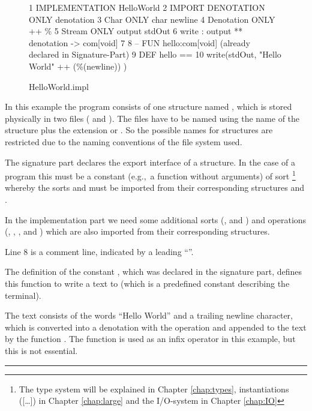 \begin{figure}[htbp]
  \leavevmode
  \begin{prog}
    1    IMPLEMENTATION HelloWorld
    2    IMPORT  DENOTATION      ONLY denotation
    3            Char            ONLY char newline
    4            Denotation      ONLY ++ \% 
    5            Stream          ONLY output stdOut 
    6                      write : output ** denotation -> com[void]
    7    
    8    -- FUN hello:com[void] (already declared in Signature-Part)
    9    DEF hello ==
    10        write(stdOut, "Hello World" ++ (\%(newline)) )
  \end{prog}
  \caption{HelloWorld.impl}
\end{figure}

In this example the program consists of one structure named
, which  is stored physically in two files
( and ). 
The files have to be named using the name of the structure plus the
extension  or .
So the possible names for structures are restricted due to the naming
conventions of the  file system used.

The signature part declares the export interface of a structure.
In the case of a program this must be a constant (e.g.,~a function
without arguments) of sort
\footnote{The type system will be explained in Chapter
\ref{chap:types}, instantiations ([\dots]) in Chapter
\ref{chap:large} and the I/O-system in  Chapter \ref{chap:IO}} whereby
the sorts  and  must be imported from their
corresponding structures  and .

In the implementation part we need some additional sorts (,
 and ) and operations
(, , \pro{\%},\pro{++} and ) which
are also imported from their corresponding structures.

Line 8 is a comment line, indicated by a leading ``\pro{--}''.

The definition of the constant , which was declared in the
signature part, defines this function to write a text to 
(which is a predefined constant describing the terminal).

The text consists of the words ``Hello World'' and a trailing
newline character, which is converted into a denotation with the operation
\pro{\%} and appended to the text by the function \pro{++}.
 The function \pro{++} is used as an infix operator in this example,
but this is not essential.
%
\newline\rule{5cm}{1pt}

